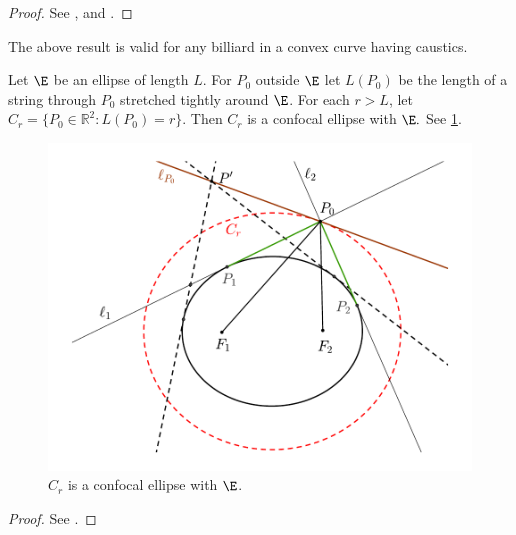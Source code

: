  \begin{proof}
 See \cite{chasles1843}, \cite[pp. 283-284]{darboux1917} and \cite[pp. 115-116]{carneiro2005}. 
 \end{proof}
 
  The  above result is valid for any billiard in a convex curve having caustics. 
 
 
      
   \begin{proposition}\label{prop:caustic} Let $\E$ be an ellipse of length $L$.
   For $P_0$  outside $\E$ let $ L(P_0)$   be the length of a string through $P_0$ stretched tightly around $\E$. For each $r>L$, let $C_r=\{P_0\in\mathbb{R}^2: L(P_0)=r\}.$  Then  $C_r$ is a confocal ellipse with $\E.$ See \cref{fig:reciproca_graves}.
      \end{proposition} 
      
       \begin{figure}
 \begin{center}
   \includegraphics[scale=0.7]{chap_09/pics/pics_09_005_graves_reciproca2.pdf}
		\caption{ $C_r$ is a confocal  ellipse with $\E$.}
		\label{fig:reciproca_graves}
 	\end{center}
\end{figure}
 \begin{proof} See \cite[page 14]{akopyan2007-conics}.
 \end{proof}
